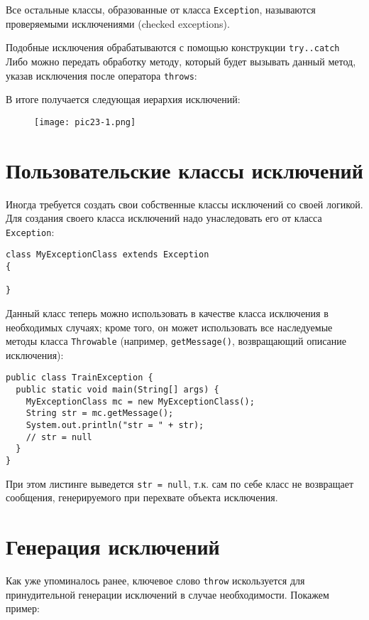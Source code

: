 Все остальные классы, образованные от класса \verb|Exception|, называются проверяемыми исключениями (checked exceptions).

Подобные исключения обрабатываются с помощью конструкции \verb|try..catch| Либо можно передать обработку методу, который будет вызывать данный метод, указав исключения после оператора \verb|throws|:

В итоге получается следующая иерархия исключений:

\begin{figure}[h]
\centering
\texttt{[image: pic23-1.png]}
\label{fig:mpr}
\end{figure}

\section{Пользовательские классы исключений}

Иногда требуется создать свои собственные классы исключений со своей логикой. Для создания своего класса исключений надо унаследовать его от класса \verb|Exception|:

\begin{lstlisting}
class MyExceptionClass extends Exception
{

}
\end{lstlisting}

Данный класс теперь можно использовать в качестве класса исключения в необходимых случаях; кроме того, он может использовать все наследуемые методы класса \verb|Throwable| (например, \verb|getMessage()|, возвращающий описание исключения):

\begin{lstlisting}
public class TrainException {
  public static void main(String[] args) {
    MyExceptionClass mc = new MyExceptionClass();
    String str = mc.getMessage();
    System.out.println("str = " + str);
    // str = null
  }
}
\end{lstlisting}

При этом листинге выведется \verb|str = null|, т.к. сам по себе класс не возвращает сообщения, генерируемого при перехвате объекта исключения.

\section{Генерация исключений}

Как уже упоминалось ранее, ключевое слово \verb|throw| искользуется для принудительной генерации исключений в случае необходимости. Покажем пример:

